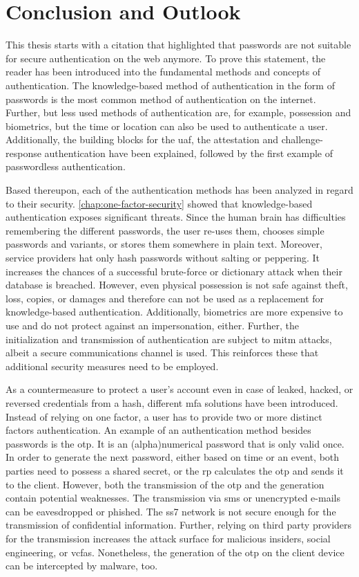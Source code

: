 \chapter{Conclusion and Outlook}

This thesis starts with a citation that highlighted that passwords are not suitable for secure authentication on the web anymore. To prove this statement, the reader has been introduced into the fundamental methods and concepts of authentication. The knowledge-based method of authentication in the form of passwords is the most common method of authentication on the internet. Further, but less used methods of authentication are, for example, possession and biometrics, but the time or location can also be used to authenticate a user. Additionally, the building blocks for the \gls{uaf}, the attestation and challenge-response authentication have been explained, followed by the first example of passwordless authentication.

Based thereupon, each of the authentication methods has been analyzed in regard to their security. \autoref{chap:one-factor-security} showed that knowledge-based authentication exposes significant threats. Since the human brain has difficulties remembering the different passwords, the user re-uses them, chooses simple passwords and variants, or stores them somewhere in plain text. Moreover, service providers hat only hash passwords without salting or peppering. It increases the chances of a successful brute-force or dictionary attack when their database is breached. However, even physical possession is not safe against theft, loss, copies, or damages and therefore can not be used as a replacement for knowledge-based authentication. Additionally, biometrics are more expensive to use and do not protect against an impersonation, either. Further, the initialization and transmission of authentication are subject to \gls{mitm} attacks, albeit a secure communications channel is used. This reinforces these that additional security measures need to be employed.

As a countermeasure to protect a user's account even in case of leaked, hacked, or reversed credentials from a hash, different \gls{mfa} solutions have been introduced. Instead of relying on one factor, a user has to provide two or more distinct factors authentication. An example of an authentication method besides passwords is the \gls{otp}. It is an (alpha)numerical password that is only valid once. In order to generate the next password, either based on time or an event, both parties need to possess a shared secret, or the \gls{rp} calculates the \gls{otp} and sends it to the client. However, both the transmission of the \gls{otp} and the generation contain potential weaknesses. The transmission via \gls{sms} or unencrypted e-mails can be eavesdropped or phished. The \gls{ss7} network is not secure enough for the transmission of confidential information. Further, relying on third party providers for the transmission increases the attack surface for malicious insiders, social engineering, or \glspl{vcfa}. Nonetheless, the generation of the \gls{otp} on the client device can be intercepted by malware, too.

